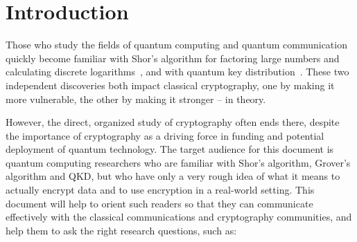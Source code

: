 \section{Introduction}




Those who study the fields of quantum computing and quantum
communication quickly become familiar with Shor's algorithm for
factoring large numbers and calculating discrete
logarithms~\cite{shor:siam-factor}, and with quantum key
distribution~\cite{bennett:bb84,PhysRevLett.68.557,ekert1991qcb,PhysRevLett.108.130503,xu2015measurement,Vazirani:2019:FDI:3321370.3310974,RevModPhys.81.1301,PhysRevLett.85.441}.
These two independent discoveries both impact classical cryptography,
one by making it more vulnerable, the other by making it stronger --
in theory.

However, the direct, organized study of cryptography often ends there,
despite the importance of cryptography as a driving force in funding
and potential deployment of quantum technology.  The target audience
for this document is quantum computing researchers who are familiar
with Shor's algorithm, Grover's algorithm and QKD, but who have only a
very rough idea of what it means to actually encrypt data and to use
encryption in a real-world setting.  This document will help to orient
such readers so that they can communicate effectively with the
classical communications and cryptography communities, and help them
to ask the right research questions, such as:

